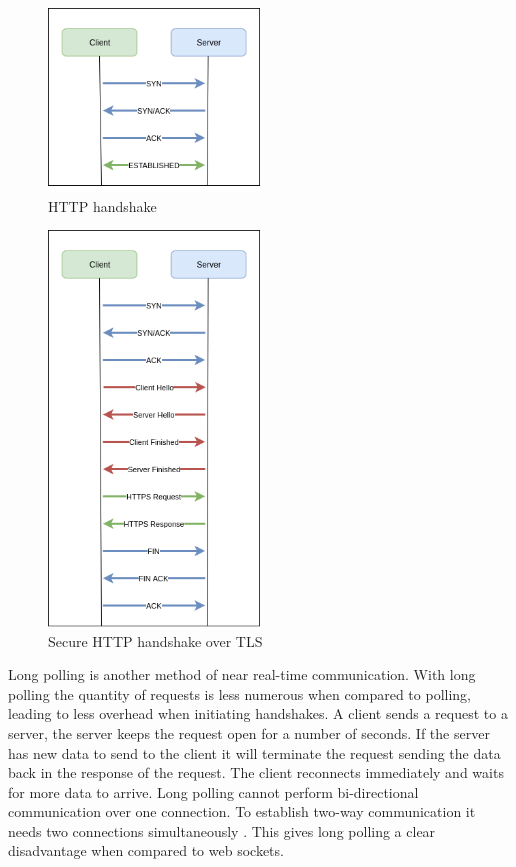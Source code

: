 \begin{figure}[ht]
  \centering
    \includegraphics[width=0.5\textwidth]{figures/http-handshake.png}
    \caption{HTTP handshake}
    \label{fig:http-handshake}
\end{figure}

\begin{figure}[ht]
  \centering
    \includegraphics[width=0.5\textwidth]{figures/https-handshake.png}
    \caption{Secure HTTP handshake over TLS}
    \label{fig:https-handshake}
\end{figure}

Long polling is another method of near real-time communication. With long polling the quantity of requests is less numerous when compared to polling, leading to less overhead when initiating handshakes. A client sends a request to a server, the server keeps the request open for a number of seconds. If the server has new data to send to the client it will terminate the request sending the data back in the response of the request. The client reconnects immediately and waits for more data to arrive. Long polling cannot perform bi-directional communication over one connection. To establish two-way communication it needs two connections simultaneously \cite{6364271}. This gives long polling a clear disadvantage when compared to web sockets.

